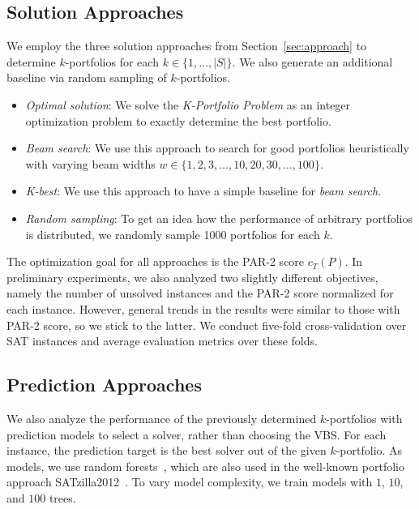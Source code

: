 \documentclass[runningheads]{llncs}
\begin{document}
\subsection{Solution Approaches}

We employ the three solution approaches from Section~\ref{sec:approach} to determine $k$-portfolios for each $k \in \{1, \dots, |S|\}$. 
We also generate an additional baseline via random sampling of $k$-portfolios.

\begin{itemize}
	\item \emph{Optimal solution}:
	We solve the \emph{K-Portfolio Problem} as an integer optimization problem to exactly determine the best portfolio.
	\item \emph{Beam search}: 
	We use this approach to search for good portfolios heuristically with varying beam widths $w \in \{1, 2, 3, \dots, 10, 20, 30, \dots, 100\}$.
	\item \emph{K-best}:
	We use this approach to have a simple baseline for \emph{beam search}.
	\item \emph{Random sampling}:
	To get an idea how the performance of arbitrary portfolios is distributed, we randomly sample 1000 portfolios for each $k$.
\end{itemize}

The optimization goal for all approaches is the PAR-2 score $c_T(P)$.
In preliminary experiments, we also analyzed two slightly different objectives, namely the number of unsolved instances and the PAR-2 score normalized for each instance.
However, general trends in the results were similar to those with PAR-2 score, so we stick to the latter.
We conduct five-fold cross-validation over SAT instances and average evaluation metrics over these folds. 

\subsection{Prediction Approaches}

We also analyze the performance of the previously determined $k$-portfolios with prediction models to select a solver, rather than choosing the VBS. 
For each instance, the prediction target is the best solver out of the given $k$-portfolio.
As models, we use random forests~\cite{breiman2001random}, which are also used in the well-known portfolio approach SATzilla2012~\cite{xu2012satzilla2012}. 
To vary model complexity, we train models with $1$, $10$, and $100$ trees.
\end{document}
